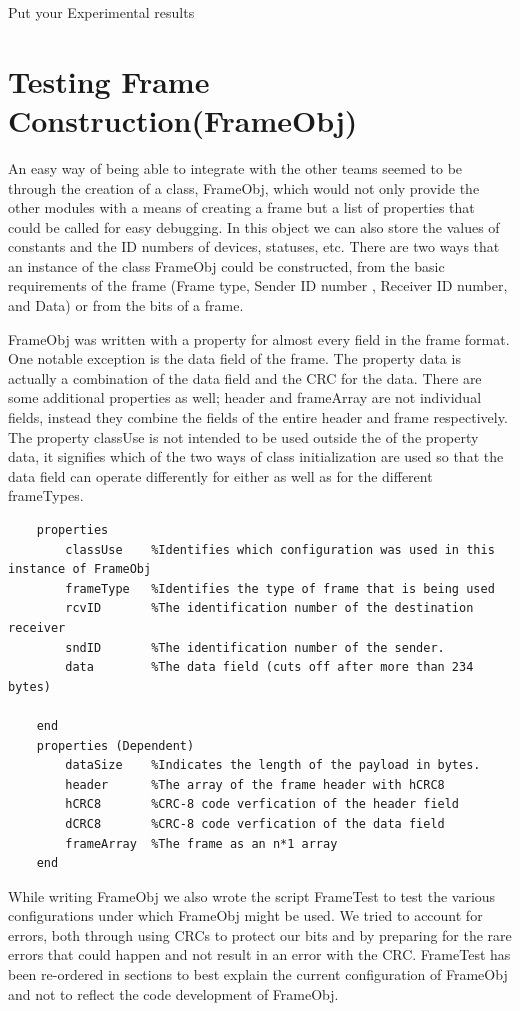 
Put your Experimental results
\section{Testing Frame Construction(FrameObj)}
An easy way of being able to integrate with the other teams seemed to be through the creation of a class, FrameObj, which would not only provide the other modules with a means of creating a frame but a list of properties that could be called for easy debugging. In this object we can also store the values of constants and the ID numbers of devices, statuses, etc.  There are two ways that an instance of the class FrameObj could be constructed,  from the basic requirements of the frame (Frame type, Sender ID number , Receiver ID number, and Data) or from the bits of a frame.

FrameObj was written with a property for almost every field in the frame format. One notable exception is the data field of the frame. The property data is actually a combination of the data field and the CRC for the data. There are some additional properties as well; header and frameArray are not individual fields, instead they combine the fields of the entire header and frame respectively. The property classUse is not intended to be used outside the of the property data, it signifies which of the two ways of class initialization are used so that the data field can operate differently for either as well as for the different frameTypes.
\begin{lstlisting} 
    properties
        classUse    %Identifies which configuration was used in this instance of FrameObj
        frameType   %Identifies the type of frame that is being used
        rcvID       %The identification number of the destination receiver
        sndID       %The identification number of the sender.
        data        %The data field (cuts off after more than 234 bytes)
        
    end
    properties (Dependent)
        dataSize    %Indicates the length of the payload in bytes.
        header      %The array of the frame header with hCRC8
        hCRC8       %CRC-8 code verfication of the header field
        dCRC8       %CRC-8 code verfication of the data field
        frameArray  %The frame as an n*1 array
    end
\end{lstlisting}

While writing FrameObj we also wrote the script FrameTest to test the various configurations under which FrameObj might be used. We tried to account for errors, both through using CRCs to protect our bits and by preparing for the rare errors that could happen and not result in an error with the CRC. FrameTest has been re-ordered in sections to best explain the current configuration of FrameObj and not to reflect the code development of FrameObj.

